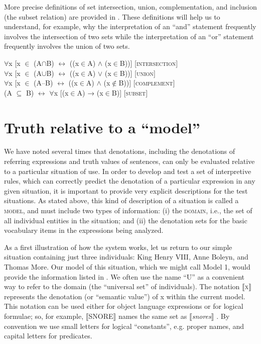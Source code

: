 More precise definitions of set intersection, union, complementation, and inclusion (the subset relation) are provided in . These definitions will help us to understand, for example, why the interpretation of an “and” statement frequently involves the intersection of two sets while the interpretation of an “or” statement frequently involves the union of two sets.


\ea \label{ex:13.19}
${\forall}$x [x ${\in}$ (A${\cap}$B)  $\leftrightarrow $  ((x${\in}$A) $\wedge$ (x${\in}$B))] \hfill [\textsc{intersection}]\\
${\forall}$x [x ${\in}$ (A${\cup}$B)  $\leftrightarrow $  ((x${\in}$A) $\vee$ (x${\in}$B))] \hfill [\textsc{union}]\\
${\forall}$x [x ${\in}$ (A–B)  $\leftrightarrow $  ((x${\in}$A) $\wedge$ (x${\notin}$B))] \hfill [\textsc{complement}]\\
(A ${\subseteq}$ B)  $\leftrightarrow $  ${\forall}$x [(x${\in}$A) → (x${\in}$B)] \hfill [\textsc{subset}]
\z

\section{Truth relative to a “model”}\label{sec:13.4}

We have noted several times that denotations, including the denotations of referring expressions and truth values of sentences, can only be evaluated relative to a particular situation of use. In order to develop and test a set of interpretive rules, which can correctly predict the denotation of a particular expression in any given situation, it is important to provide very explicit descriptions for the test situations. As stated above, this kind of description of a situation is called a \textsc{model}, and must include two types of information: (i) the \textsc{domain}, i.e., the set of all individual entities in the situation; and (ii) the denotation sets for the basic vocabulary items in the expressions being analyzed.



As a first illustration of how the system works, let us return to our simple situation containing just three individuals: King Henry VIII, Anne Boleyn, and Thomas More. Our model of this situation, which we might call Model 1, would provide the information listed in . We often use the name “U” as a convenient way to refer to the domain (the “universal set” of individuals). The notation \textsc{$\llbracket$x}$\rrbracket$  represents the denotation (or “semantic value”) of x within the current model. This notation can be used either for object language expressions or for logical formulae; so, for example, $\llbracket$SNORE$\rrbracket$  names the same set as $\llbracket$\textit{snores}$\rrbracket$ . By convention we use small letters for logical “constants”, e.g. proper names, and capital letters for predicates.


